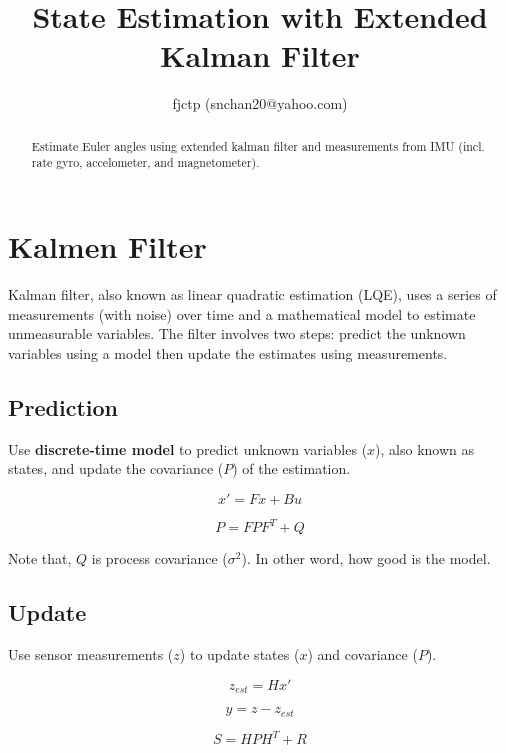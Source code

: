 \documentclass[]{article}
\title{State Estimation with Extended Kalman Filter}
\author{fjctp (snchan20@yahoo.com)}
\begin{document}
\maketitle

\begin{abstract}
Estimate Euler angles using extended kalman filter and measurements from IMU (incl. rate gyro, accelometer, and magnetometer).
\end{abstract}

\section{Kalmen Filter}
Kalman filter, also known as linear quadratic estimation (LQE), uses a series of measurements (with noise) over time and a  mathematical model to estimate unmeasurable variables. The filter involves two steps: predict the unknown variables using a model then update the estimates using measurements.

\subsection{Prediction}
Use \textbf{discrete-time model} to predict unknown variables ($x$), also known as states, and update the covariance ($P$) of the estimation.

\begin{equation}
x' = Fx + Bu\label{eqn:model}
\end{equation}

\begin{equation}
P = FPF^T + Q\label{eqn:predict_covarance}
\end{equation}

Note that, $Q$ is process covariance ($\sigma^2$). In other word, how good is the model. 

\subsection{Update}
Use sensor measurements ($z$) to update states ($x$) and covariance ($P$). 

\begin{equation}
z_{est} = Hx'\label{eqn:predict_measurement}
\end{equation}

\begin{equation}
y = z - z_{est}\label{eqn:measurement_difference}
\end{equation}

\begin{equation}
S = HPH^T + R\label{eqn:innovation_covariance}
\end{equation}
\end{document}
